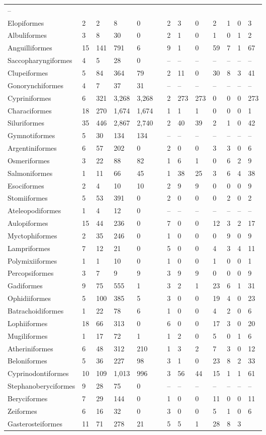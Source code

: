 \documentclass[11pt]{exam}
\begin{document}
\begin{landscape}
\begin{longtable}[l]{@{}L{1.4in}R{0.3in}R{0.4in}R{0.4in}R{0.4in}lR{0.3in}R{0.3in}R{0.3in}R{0.3in}R{0.3in}R{0.4in}R{0.4in}@{}}
–\tabularnewline
Elopiformes & 2 & 2 & 8 & 0 & & 2 & 3 & 0 & 2 & 1 & 0 & 3\tabularnewline
Albuliformes & 3 & 8 & 30 & 0 & & 2 & 1 & 0 & 1 & 0 & 1 &
2\tabularnewline
Anguilliformes & 15 & 141 & 791 & 6 & & 9 & 1 & 0 & 59 & 7 & 1 &
67\tabularnewline
Saccopharyngiformes & 4 & 5 & 28 & 0 & & – & – & – & – & – & – &
–\tabularnewline
Clupeiformes~ & 5 & 84 & 364 & 79 & & 2 & 11 & 0 & 30 & 8 & 3 &
41\tabularnewline
Gonorynchiformes~ & 4 & 7 & 37 & 31 & & – & – & – & – & – & – &
–\tabularnewline
Cypriniformes & 6 & 321 & 3,268 & 3,268 & & 2 & 273 & 273 & 0 & 0 & 0 &
273\tabularnewline
Characiformes & 18 & 270 & 1,674 & 1,674 & & 1 & 1 & 1 & 0 & 0 & 0 &
1\tabularnewline
Siluriformes & 35 & 446 & 2,867 & 2,740 & & 2 & 40 & 39 & 2 & 1 & 0 &
42\tabularnewline
Gymnotiformes & 5 & 30 & 134 & 134 & & – & – & – & – & – & – &
–\tabularnewline
Argentiniformes & 6 & 57 & 202 & 0 & & 2 & 0 & 0 & 3 & 3 & 0 &
6\tabularnewline
Osmeriformes & 3 & 22 & 88 & 82 & & 1 & 6 & 1 & 0 & 6 & 2 &
9\tabularnewline
Salmoniformes & 1 & 11 & 66 & 45 & & 1 & 38 & 25 & 3 & 6 & 4 &
38\tabularnewline
Esociformes & 2 & 4 & 10 & 10 & & 2 & 9 & 9 & 0 & 0 & 0 &
9\tabularnewline
Stomiiformes & 5 & 53 & 391 & 0 & & 2 & 0 & 0 & 0 & 2 & 0 &
2\tabularnewline
Ateleopodiformes & 1 & 4 & 12 & 0 & & – & – & – & – & – & – &
–\tabularnewline
Aulopiformes & 15 & 44 & 236 & 0 & & 7 & 0 & 0 & 12 & 3 & 2 &
17\tabularnewline
Myctophiformes & 2 & 35 & 246 & 0 & & 1 & 0 & 0 & 0 & 9 & 0 &
9\tabularnewline
Lampriformes & 7 & 12 & 21 & 0 & & 5 & 0 & 0 & 4 & 3 & 4 &
11\tabularnewline
Polymixiiformes & 1 & 1 & 10 & 0 & & 1 & 0 & 0 & 1 & 0 & 0 &
1\tabularnewline
Percopsiformes & 3 & 7 & 9 & 9 & & 3 & 9 & 9 & 0 & 0 & 0 &
9\tabularnewline
Gadiformes & 9 & 75 & 555 & 1 & & 3 & 2 & 1 & 23 & 6 & 1 &
31\tabularnewline
Ophidiiformes & 5 & 100 & 385 & 5 & & 3 & 0 & 0 & 19 & 4 & 0 &
23\tabularnewline
Batrachoidiformes & 1 & 22 & 78 & 6 & & 1 & 0 & 0 & 4 & 2 & 0 &
6\tabularnewline
Lophiiformes & 18 & 66 & 313 & 0 & & 6 & 0 & 0 & 17 & 3 & 0 &
20\tabularnewline
Mugiliformes & 1 & 17 & 72 & 1 & & 1 & 2 & 0 & 5 & 0 & 1 &
6\tabularnewline
Atheriniformes & 6 & 48 & 312 & 210 & & 1 & 3 & 2 & 7 & 3 & 0 &
12\tabularnewline
Beloniformes & 5 & 36 & 227 & 98 & & 3 & 1 & 0 & 23 & 8 & 2 &
33\tabularnewline
Cyprinodontiformes & 10 & 109 & 1,013 & 996 & & 3 & 56 & 44 & 15 & 1 & 1
& 61\tabularnewline
Stephanoberyciformes & 9 & 28 & 75 & 0 & & – & – & – & – & – & – &
–\tabularnewline
Beryciformes & 7 & 29 & 144 & 0 & & 1 & 0 & 0 & 11 & 0 & 0 &
11\tabularnewline
Zeiformes & 6 & 16 & 32 & 0 & & 3 & 0 & 0 & 5 & 1 & 0 & 6\tabularnewline
Gasterosteiformes & 11 & 71 & 278 & 21 & & 5 & 5 & 1 & 28 & 8 & 3 &

\end{longtable}
\end{landscape}
\end{document}
